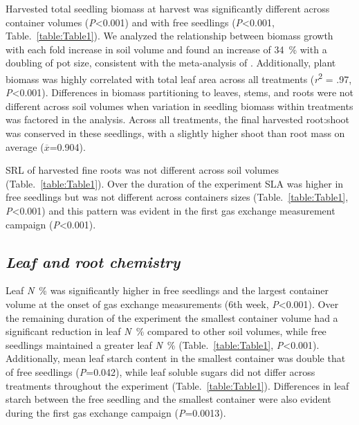 \documentclass[a4paper]{article}\usepackage[]{graphicx}\usepackage[]{color}
\begin{document}
Harvested total seedling biomass at harvest was significantly different across container volumes (\textit{P}\textless0.001) and with free seedlings (\textit{P}\textless0.001, Table.~\ref{table:Table1}). We analyzed the relationship between biomass growth with each fold increase in soil volume and found an increase of 34~\% with a doubling of pot size, consistent with the meta-analysis of \citet{poorter2012pot}. Additionally, plant biomass was highly correlated with total leaf area across all treatments (\textit{r}\textsuperscript{2} = .97, \textit{P}\textless0.001). Differences in biomass partitioning to leaves, stems, and roots were not different across soil volumes when variation in seedling biomass within treatments was factored in the analysis. Across all treatments, the final harvested root:shoot was conserved in these seedlings, with a slightly higher shoot than root mass on average ($\overline{x}$=0.904).

SRL of harvested fine roots was not different across soil volumes (Table.~\ref{table:Table1}). Over the duration of the experiment SLA was higher in free seedlings but was not different across containers sizes (Table.~\ref{table:Table1}, \textit{P}\textless0.001) and this pattern was evident in the first gas exchange measurement campaign (\textit{P}\textless0.001).

\subsection*{\textit{Leaf and root chemistry}}
Leaf \textit{N}~\% was significantly higher in free seedlings and the largest container volume at the onset of gas exchange measurements (6th week, \textit{P}\textless0.001).  Over the remaining duration of the experiment the smallest container volume had a significant reduction in leaf \textit{N}~\% compared to other soil volumes, while free seedlings maintained a greater leaf \textit{N}~\% (Table.~\ref{table:Table1}, \textit{P}\textless0.001).  Additionally, mean leaf starch content in the smallest container was double that of free seedlings (\textit{P}=0.042), while leaf soluble sugars did not differ across treatments throughout the experiment (Table.~\ref{table:Table1}).  Differences in leaf starch between the free seedling and the smallest container were also evident during the first gas exchange campaign (\textit{P}=0.0013). 
\end{document}
